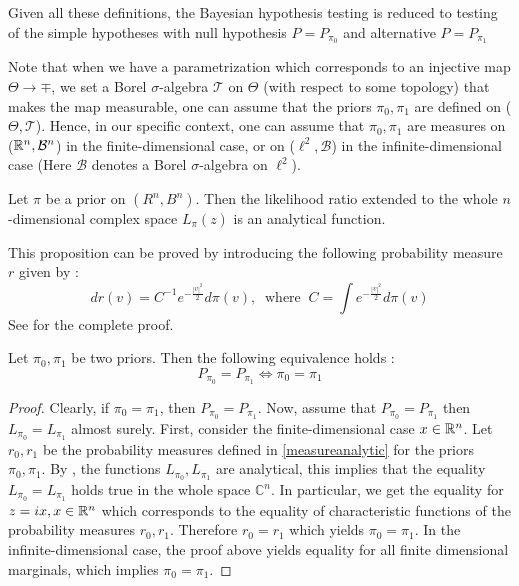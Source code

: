 Given all these definitions, the Bayesian hypothesis testing is reduced to testing of the simple hypotheses with null hypothesis $P = P_{\pi_0}$ and alternative $P = P_{\pi_1}$
\begin{remark}
    Note that when we have a parametrization which corresponds to an injective map $\Theta \rightarrow \mp$, we set a Borel $\sigma$-algebra $\mathcal{T}$ on $\Theta$ (with respect to some topology) that makes the map measurable, one can assume that the priors $\pi_0,\pi_1$ are defined on ($\Theta,\mathcal{T}$). Hence, in our specific context, one can assume that $\pi_0,\pi_1$ are measures on ($\mathbb{R}^n,\mathcal{B}^n$) in the finite-dimensional case, or on ($\ell^2,\mathcal{B}$) in the infinite-dimensional case (Here $\mathcal{B}$ denotes a Borel $\sigma$-algebra on $\ell^2$).
\end{remark}
\begin{prop}\label{analyticity}\citet[Proposition 2.2]{Ing2012}
Let $\pi$ be a prior on $(R^n, B^n)$. Then the likelihood ratio extended to the whole $n$-dimensional complex space $L_\pi(z)$ is an analytical function.
\end{prop}
\begin{remark}
This proposition can be proved by introducing the following probability measure $r$ given by : 
\begin{equation}\label{measureanalytic}
    dr(v) = C^{-1} e^{-\frac{|v|^2}{2}}d\pi(v), \ \text{ where } \ C = \int e^{-\frac{|v|^2}{2}}d\pi(v)
\end{equation}
See \citet{Ing2012} for the complete proof.
\end{remark}
\begin{prop}\label{prop2.1}\citet[Proposition 2.3]{Ing2012}
    Let $\pi_0,\pi_1$ be two priors. Then the following equivalence holds : 
    \begin{equation*}
        P_{\pi_0} = P_{\pi_1} \Leftrightarrow \pi_0 = \pi_1
    \end{equation*}
\end{prop}
\begin{proof}
    Clearly, if $\pi_0 = \pi_1$, then $P_{\pi_0} = P_{\pi_1}$. Now, assume that $P_{\pi_0} = P_{\pi_1}$ then $L_{\pi_0} = L_{\pi_1}$ almost surely. 
    First, consider the finite-dimensional case $x \in \mathbb{R}^n$. Let $r_0,r_1$ be the probability measures defined in \cref{measureanalytic} for the priors $\pi_0,\pi_1$. By , the functions $L_{\pi_0},L_{\pi_1}$ are analytical, this implies that the equality $L_{\pi_0}=L_{\pi_1}$ holds true in the whole space $\mathbb{C}^n$. In particular, we get the equality for $z = ix, x\in \mathbb{R}^n$ which corresponds to the equality of characteristic functions of the probability measures $r_0,r_1$. Therefore $r_0 = r_1$ which yields $\pi_0 = \pi_1$. 
    In the infinite-dimensional case, the proof above yields equality for all finite dimensional marginals, which implies $\pi_0 = \pi_1$.
\end{proof}


